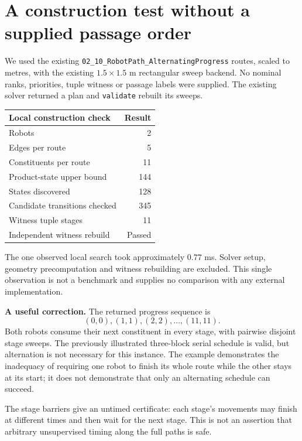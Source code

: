\documentclass[11pt,a4paper]{article}
\begin{document}
\section{A construction test without a supplied passage order}
We used the existing \texttt{02\_10\_RobotPath\_AlternatingProgress} routes, scaled
to metres, with the existing $1.5\times1.5$ m rectangular sweep backend. No
nominal ranks, priorities, tuple witness or passage labels were supplied.
The existing solver returned a plan and \texttt{validate} rebuilt its sweeps.
\begin{center}
\begin{tabular}{lr}\toprule
Local construction check & Result\\\midrule
Robots & 2\\
Edges per route & 5\\
Constituents per route & 11\\
Product-state upper bound & 144\\
States discovered & 128\\
Candidate transitions checked & 345\\
Witness tuple stages & 11\\
Independent witness rebuild & Passed\\\bottomrule
\end{tabular}
\end{center}
The one observed local search took approximately $0.77$ ms. Solver setup,
geometry precomputation and witness rebuilding are excluded. This single observation is
not a benchmark and supplies no comparison with any external implementation.

\textbf{A useful correction.} The returned progress sequence is
\begin{equation}
(0,0),(1,1),(2,2),\ldots,(11,11).
\end{equation}
Both robots consume their next constituent in every stage, with pairwise
disjoint stage sweeps. The previously illustrated three-block serial schedule
is valid, but alternation is not necessary for this instance. The example
demonstrates the inadequacy of requiring one robot to finish its whole route
while the other stays at its start; it does not demonstrate that only an
alternating schedule can succeed.

The stage barriers give an untimed certificate: each stage's movements may
finish at different times and then wait for the next stage. This is not an
assertion that arbitrary unsupervised timing along the full paths is safe.
\end{document}
